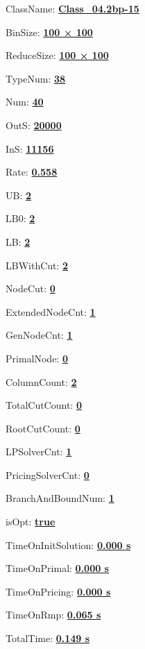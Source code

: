 \documentclass[11pt]{article}
\begin{document}
\pagestyle{empty}


ClassName: \underline{\textbf{Class_04.2bp-15}}
\par
BinSize: \underline{\textbf{100 × 100}}
\par
ReduceSize: \underline{\textbf{100 × 100}}
\par
TypeNum: \underline{\textbf{38}}
\par
Num: \underline{\textbf{40}}
\par
OutS: \underline{\textbf{20000}}
\par
InS: \underline{\textbf{11156}}
\par
Rate: \underline{\textbf{0.558}}
\par
UB: \underline{\textbf{2}}
\par
LB0: \underline{\textbf{2}}
\par
LB: \underline{\textbf{2}}
\par
LBWithCut: \underline{\textbf{2}}
\par
NodeCut: \underline{\textbf{0}}
\par
ExtendedNodeCnt: \underline{\textbf{1}}
\par
GenNodeCnt: \underline{\textbf{1}}
\par
PrimalNode: \underline{\textbf{0}}
\par
ColumnCount: \underline{\textbf{2}}
\par
TotalCutCount: \underline{\textbf{0}}
\par
RootCutCount: \underline{\textbf{0}}
\par
LPSolverCnt: \underline{\textbf{1}}
\par
PricingSolverCnt: \underline{\textbf{0}}
\par
BranchAndBoundNum: \underline{\textbf{1}}
\par
isOpt: \underline{\textbf{true}}
\par
TimeOnInitSolution: \underline{\textbf{0.000 s}}
\par
TimeOnPrimal: \underline{\textbf{0.000 s}}
\par
TimeOnPricing: \underline{\textbf{0.000 s}}
\par
TimeOnRmp: \underline{\textbf{0.065 s}}
\par
TotalTime: \underline{\textbf{0.149 s}}
\par
\newpage
\end{document}
